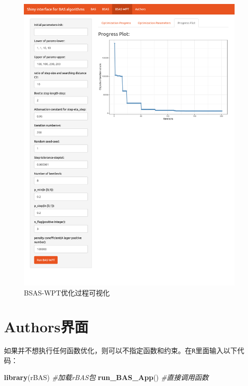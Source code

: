 \documentclass[]{ctexbook}
\newenvironment{Shaded}{\begin{snugshade}}{\end{snugshade}}
\newcommand{\KeywordTok}[1]{\textcolor[rgb]{0.13,0.29,0.53}{\textbf{#1}}}
\newcommand{\CommentTok}[1]{\textcolor[rgb]{0.56,0.35,0.01}{\textit{#1}}}
\newcommand{\NormalTok}[1]{#1}
\begin{document}
\begin{figure}

{\centering \includegraphics[width=0.95\linewidth]{img/wpt3} 

}

\caption{BSAS-WPT优化过程可视化}\label{fig:wptplot}
\end{figure}

\section{Authors界面}\label{authors}

如果并不想执行任何函数优化，则可以不指定函数和约束。在\texttt{R}里面输入以下代码：

\begin{Shaded}
\begin{Highlighting}[]
\KeywordTok{library}\NormalTok{(rBAS) }\CommentTok{#加载rBAS包}
\KeywordTok{run_BAS_App}\NormalTok{() }\CommentTok{#直接调用函数}
\end{Highlighting}
\end{Shaded}
\end{document}
